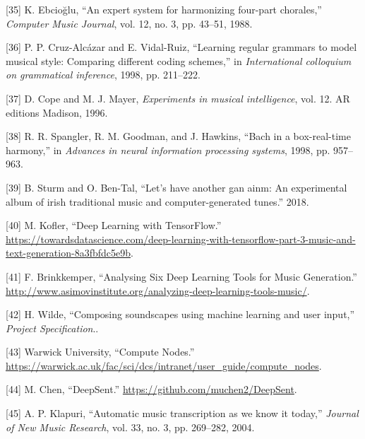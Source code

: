 \documentclass[12pt,]{article}
\begin{document}
\leavevmode\hypertarget{ref-ebciouglu1988expert}{}%
{[}35{]} K. Ebcioğlu, ``An expert system for harmonizing four-part
chorales,'' \emph{Computer Music Journal}, vol. 12, no. 3, pp. 43--51,
1988.

\leavevmode\hypertarget{ref-cruz1998learning}{}%
{[}36{]} P. P. Cruz-Alcázar and E. Vidal-Ruiz, ``Learning regular
grammars to model musical style: Comparing different coding schemes,''
in \emph{International colloquium on grammatical inference}, 1998, pp.
211--222.

\leavevmode\hypertarget{ref-cope1996experiments}{}%
{[}37{]} D. Cope and M. J. Mayer, \emph{Experiments in musical
intelligence}, vol. 12. AR editions Madison, 1996.

\leavevmode\hypertarget{ref-spangler1998bach}{}%
{[}38{]} R. R. Spangler, R. M. Goodman, and J. Hawkins, ``Bach in a
box-real-time harmony,'' in \emph{Advances in neural information
processing systems}, 1998, pp. 957--963.

\leavevmode\hypertarget{ref-sturm2018let}{}%
{[}39{]} B. Sturm and O. Ben-Tal, ``Let's have another gan ainm: An
experimental album of irish traditional music and computer-generated
tunes.'' 2018.

\leavevmode\hypertarget{ref-mkofler}{}%
{[}40{]} M. Kofler, ``Deep Learning with TensorFlow.'' \\
\url{https://towardsdatascience.com/deep-learning-with-tensorflow-part-3-music-and-text-generation-8a3fbfdc5e9b}.

\leavevmode\hypertarget{ref-asimovinst}{}%
{[}41{]} F. Brinkkemper, ``Analysing Six Deep Learning Tools for Music
Generation.'' \\
\url{http://www.asimovinstitute.org/analyzing-deep-learning-tools-music/}.

\leavevmode\hypertarget{ref-specification}{}%
{[}42{]} H. Wilde, ``Composing soundscapes using machine learning and
user input,'' \emph{Project Specification}..

\leavevmode\hypertarget{ref-warwickcomputenodes}{}%
{[}43{]} \relax Warwick University, ``Compute Nodes.'' \\
\url{https://warwick.ac.uk/fac/sci/dcs/intranet/user_guide/compute_nodes}.

\leavevmode\hypertarget{ref-deepsent}{}%
{[}44{]} M. Chen, ``DeepSent.''
\url{https://github.com/muchen2/DeepSent}.

\leavevmode\hypertarget{ref-klapuri2004automatic}{}%
{[}45{]} A. P. Klapuri, ``Automatic music transcription as we know it
today,'' \emph{Journal of New Music Research}, vol. 33, no. 3, pp.
269--282, 2004.
\end{document}
